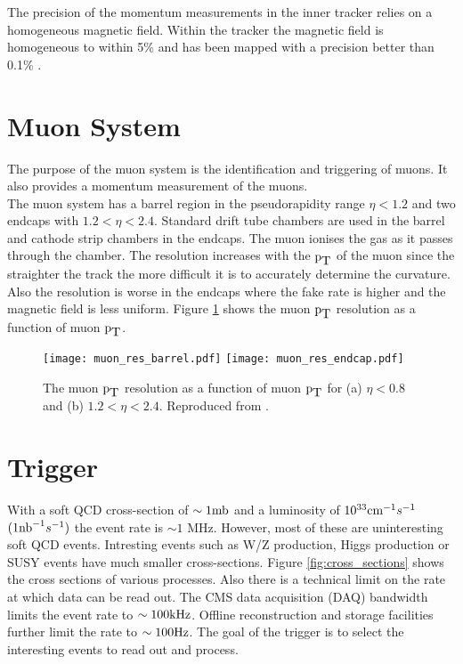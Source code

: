 The precision of the momentum measurements in the inner tracker relies on a
homogeneous magnetic field. Within the tracker the magnetic field is homogeneous
to within 5\% \cite{field_measurement} and has been mapped with a precision 
better than 0.1\% \cite{field_uniformity}.

\section{Muon System}

The purpose of the muon system is the identification and triggering of muons. It
also provides a momentum measurement of the muons. \\

The muon system has a barrel region in the pseudorapidity range $\eta < 1.2$ and
two endcaps with $1.2 < \eta < 2.4$. Standard drift tube chambers are used in
the barrel and cathode strip chambers in the endcaps. The muon ionises the gas 
as it passes through the chamber. The resolution increases with the $\mbox{p}_{\mbox{T}}$ of the
muon since the straighter the track the more difficult it is to accurately 
determine the curvature. Also the resolution is worse in the endcaps where the
fake rate is higher and the magnetic field is less uniform. Figure
\ref{fig:muon_resolution} shows the muon $\mbox{p}_{\mbox{T}}$ resolution as a function of muon
$\mbox{p}_{\mbox{T}}$.

\begin{figure}
\texttt{[image: muon\_res\_barrel.pdf]}
\texttt{[image: muon\_res\_endcap.pdf]}
\caption{The muon $\mbox{p}_{\mbox{T}}$ resolution as a function of muon $\mbox{p}_{\mbox{T}}$ for (a) $\eta <
0.8$ and (b) $1.2 < \eta < 2.4$. Reproduced from \cite{muon_resolution}.}
\label{fig:muon_resolution}
\end{figure}

\section{Trigger}

With a soft QCD cross-section of $\sim1\mbox{mb}$ and a luminosity of
$10^{33}\mbox{cm}^{-1}s^{-1}$ $(1\mbox{nb}^{-1} s^{-1})$ the event rate is $\sim 1$ MHz. 
However, most of these are uninteresting soft QCD events. Intresting events such
as W/Z production, Higgs production or SUSY events have much smaller 
cross-sections. Figure \ref{fig:cross_sections} shows the cross sections of
various processes. Also there is a technical limit on the rate at which data can
be read out. The CMS data acquisition (DAQ) bandwidth limits the event rate to 
$\sim 100\mbox{kHz}$. Offline reconstruction and storage facilities further limit the
rate to $\sim 100\mbox{Hz}$. The goal of the trigger is to select the interesting 
events to read out and process. \\

